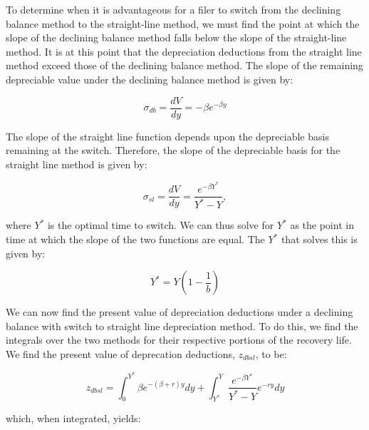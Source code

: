 \documentclass[article,11pt,letterpaper,fleqn]{article}
\theoremstyle{definition}
\numberwithin{equation}{section}
\begin{document}
To determine when it is advantageous for a filer to switch from the declining balance method to the straight-line method, we must find the point at which the slope of the declining balance method falls below the slope of the straight-line method.  It is at this point that the depreciation deductions from the straight line method exceed those of the declining balance method.  The slope of the remaining depreciable value under the declining balance method is given by:


\begin{equation}
\sigma_{db} = \frac{dV}{dy}=-\beta e^{-\beta y}
\end{equation}

\noindent\noindent The slope of the straight line function depends upon the depreciable basis remaining at the switch.  Therefore, the slope of the depreciable basis for the straight line method is given by:

\begin{equation}
\sigma_{sl} =  \frac{dV}{dy}=\frac{e^{-\beta Y^{*}}}{Y^{*}-Y},
\end{equation}

\noindent\noindent where $Y^{*}$ is the optimal time to switch. We can thus solve for $Y^{*}$ as the point in time at which the slope of the two functions are equal.  The $Y^{*}$ that solves this is given by:

\begin{equation}
Y^{*}=Y\left(1-\frac{1}{b}\right)
\end{equation}

We can now find the present value of depreciation deductions under a declining balance with switch to straight line depreciation method.  To do this, we find the integrals over the two methods for their respective portions of the recovery life.  We find the present value of deprecation deductions, $z_{dbsl}$, to be:

\begin{equation}
z_{dbsl}=\int_{0}^{Y^{*}}\beta e^{-(\beta+r)y}dy+\int_{Y^{*}}^{Y}\frac{e^{-\beta Y^{*}}}{Y^{*}-Y}e^{-ry}dy
\end{equation}

\noindent\noindent which, when integrated, yields:
\end{document}
